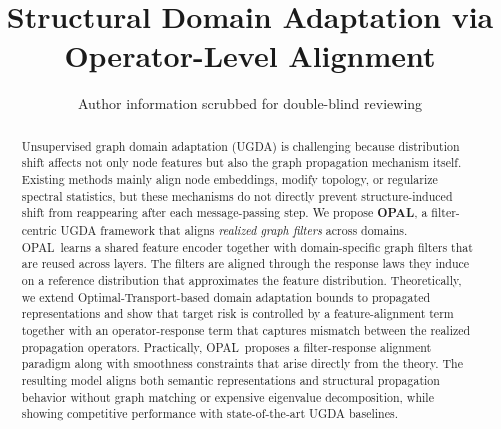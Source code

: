 \documentclass[runningheads]{llncs}
\newcommand{\model}{OPAL}
\begin{document}
\title{Structural Domain Adaptation via Operator-Level Alignment}
\author{Author information scrubbed for double-blind reviewing}
\maketitle

\begin{abstract}


Unsupervised graph domain adaptation (UGDA) is challenging because distribution shift affects not only node features but also the graph propagation mechanism itself. Existing methods mainly align node embeddings, modify topology, or regularize spectral statistics, but these mechanisms do not directly prevent structure-induced shift from reappearing after each message-passing step. We propose \textbf{\model}, a filter-centric UGDA framework that aligns \emph{realized graph filters} across domains. \model\ learns a shared feature encoder together with domain-specific graph filters that are reused across layers. The filters are aligned through the response laws they induce on a reference distribution that approximates the feature distribution. Theoretically, we extend Optimal-Transport-based domain adaptation bounds to propagated representations and show that target risk is controlled by a feature-alignment term together with an operator-response term that captures mismatch between the realized propagation operators. Practically, \model\ proposes a filter-response alignment paradigm along with smoothness constraints that arise directly from the theory. The resulting model aligns both semantic representations and structural propagation behavior without graph matching or expensive eigenvalue decomposition, while showing competitive performance with state-of-the-art UGDA baselines.
\end{abstract}

\end{document}
